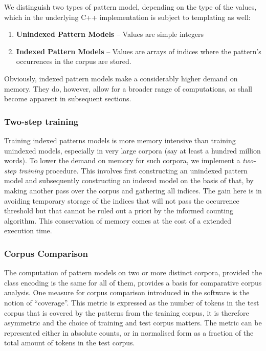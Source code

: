 \documentclass[a4paper,12pt]{article}
\begin{document}
We distinguish two types of pattern model, depending on the type of the values,
which in the underlying C++ implementation is subject to templating as well:

\begin{enumerate}
 \item \textbf{Unindexed Pattern Models} -- Values are simple integers
 \item \textbf{Indexed Pattern Models} -- Values are arrays of indices where
     the pattern's occurrences in the corpus are stored.
\end{enumerate}

Obviously, indexed pattern models make a considerably higher demand on memory.
They do, however, allow for a broader range of computations, as shall become
apparent in subsequent sections.

\subsubsection{Two-step training}

Training indexed patterns models is more memory intensive than training
unindexed models, especially in very large corpora (say at least a hundred
million words). To lower the demand on memory for such corpora, we implement a
\emph{two-step training} procedure. This involves first constructing an
unindexed pattern model and subsequently constructing an indexed model on the
basis of that, by making another pass over the corpus and gathering all
indices. The gain here is in avoiding temporary storage of the indices that
will not pass the occurrence threshold but that cannot be ruled out a priori by the
informed counting algorithm.  This conservation of memory comes at the cost of
a extended execution time.

\subsubsection{Corpus Comparison}

The computation of pattern models on two or more distinct corpora, provided the
class encoding is the same for all of them, provides a basis for comparative
corpus analysis. One measure for corpus comparison introduced in the software
is the notion of ``coverage''. This metric is expressed as the number of tokens
in the test corpus that is covered by the patterns from the training corpus, it
is therefore asymmetric and the choice of training and test corpus matters.
The metric can be represented either in absolute counts, or in normalised form
as a fraction of the total amount of tokens in the test corpus. 
\end{document}
